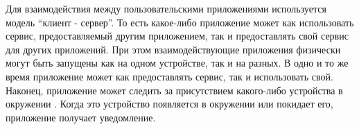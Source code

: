 %
Для взаимодействия между пользовательскими приложениями используется модель ``клиент - сервер''.
%
То есть какое-либо приложение может как использовать сервис, предоставляемый другим приложением, так и предоставлять свой сервис для других приложений. 
%
При этом взаимодействующие приложения физически могут быть запущены как на одном устройстве, так и на разных. 
%
В одно и то же время приложение может как предоставлять сервис, так и использовать свой.
%
Наконец, приложение может следить за присутствием какого-либо устройства в окружении .
%
Когда это устройство появляется в окружении или покидает его, приложение получает уведомление.